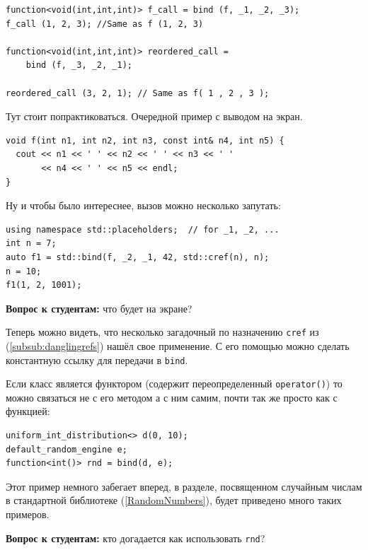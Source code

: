 \documentclass[a4paper,12pt,oneside]{article}
\newif\ifanswers
\begin{document}
\begin{lstlisting}
function<void(int,int,int)> f_call = bind (f, _1, _2, _3);
f_call (1, 2, 3); //Same as f (1, 2, 3)

function<void(int,int,int)> reordered_call = 
    bind (f, _3, _2, _1);

reordered_call (3, 2, 1); // Same as f( 1 , 2 , 3 );
\end{lstlisting}

Тут стоит попрактиковаться. Очередной пример с выводом на экран.

\begin{lstlisting}
void f(int n1, int n2, int n3, const int& n4, int n5) {
  cout << n1 << ' ' << n2 << ' ' << n3 << ' ' 
       << n4 << ' ' << n5 << endl;
}
\end{lstlisting}

Ну и чтобы было интереснее, вызов можно несколько запутать:

\begin{lstlisting}
using namespace std::placeholders;  // for _1, _2, ...
int n = 7;
auto f1 = std::bind(f, _2, _1, 42, std::cref(n), n);
n = 10;
f1(1, 2, 1001); 
\end{lstlisting}

\textbf{Вопрос к студентам:} что будет на экране?

\ifanswers
Первый аргумент \lstinline!f1! привязан к \lstinline!n2!, второй к \lstinline!n1!, третий 42, четвертый \lstinline!n! по ссылке, то есть 10, пятый \lstinline!n! по значению то есть 7, а аргумент 1001 не использован вообще.
\fi

Теперь можно видеть, что несколько загадочный по назначению \lstinline!cref! из (\ref{subsub:danglingrefs}) нашёл свое применение. С его помощью можно сделать константную ссылку для передачи в \lstinline!bind!.

Если класс является функтором (содержит переопределенный \lstinline!operator()!) то можно связаться не с его методом а с ним самим, почти так же просто как с функцией:

\begin{lstlisting}
uniform_int_distribution<> d(0, 10);
default_random_engine e;
function<int()> rnd = bind(d, e);
\end{lstlisting}

Этот пример немного забегает вперед, в разделе, посвященном случайным числам в стандартной библиотеке (\ref{RandomNumbers}), будет приведено много таких примеров.

\textbf{Вопрос к студентам:} кто догадается как использовать \lstinline!rnd!?
\end{document}
